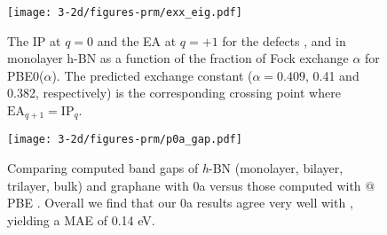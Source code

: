 \begin{figure}[h]
\begin{center}
\texttt{[image: 3-2d/figures-prm/exx\_eig.pdf]}
\caption{The IP at $q=0$ and the EA at $q=+1$ for the defects \cbns , \cn and \vncb in monolayer h-BN as a function of the fraction of Fock exchange $\alpha$ for PBE0($\alpha$). The predicted exchange constant ($\alpha = 0.409$, 0.41 and 0.382, respectively) is the corresponding crossing point where $\text{EA}_{q+1}=\text{IP}_{q}$.} \label{fig:ipea}
\end{center}
\end{figure}

\begin{figure}[h]
\begin{center}
\texttt{[image: 3-2d/figures-prm/p0a\_gap.pdf]}
\caption{Comparing computed band gaps of \textit{h}-BN (monolayer, bilayer, trilayer, bulk) and graphane with \p0a versus those computed with \gwns$@$PBE . Overall we find that our \p0a results agree very well with \gwns , yielding a MAE of 0.14 eV. } \label{fig:p0a}
\end{center}
\end{figure}

